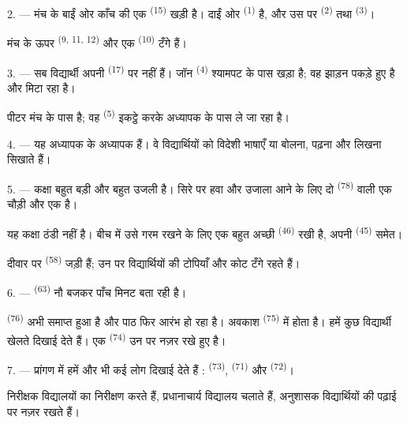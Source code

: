 2. --- मंच के बाईं ओर काँच की एक  \textsuperscript{(15)} खड़ी है।
दाईं ओर  \textsuperscript{(1)} है, और उस पर 
\textsuperscript{(2)} तथा  \textsuperscript{(3)}।

मंच के ऊपर  \textsuperscript{(9, 11, 12)} और एक
 \textsuperscript{(10)} टँगे हैं।

3. --- सब विद्यार्थी अपनी  \textsuperscript{(17)} पर नहीं हैं। जॉन
\textsuperscript{(4)} श्यामपट के पास खड़ा है; वह झाड़न पकड़े हुए है और
 मिटा रहा है।

पीटर मंच के पास है; वह  \textsuperscript{(5)} इकट्ठे करके
अध्यापक के पास ले जा रहा है।

4. --- यह अध्यापक  के अध्यापक हैं। वे विद्यार्थियों को
विदेशी भाषाएँ  या
 बोलना, पढ़ना और लिखना सिखाते हैं।

5. --- कक्षा बहुत बड़ी और बहुत उजली है। सिरे पर हवा और उजाला आने के लिए दो
 \textsuperscript{(78)} वाली एक चौड़ी  और एक
 है।

यह कक्षा ठंडी नहीं है। बीच में उसे गरम रखने के लिए एक बहुत अच्छी
 \textsuperscript{(46)} रखी है, अपनी 
\textsuperscript{(45)} समेत।

दीवार पर  \textsuperscript{(58)} जड़ी हैं; उन पर विद्यार्थियों की
टोपियाँ और कोट टँगे रहते हैं।

\VUsaut{5.2mm}
\VUsaut{3.6mm}

6. ---  \textsuperscript{(63)} नौ बजकर पाँच मिनट बता रही है।

 \textsuperscript{(76)} अभी समाप्त हुआ है और पाठ फिर आरंभ हो रहा है।
अवकाश  \textsuperscript{(75)} में होता है। हमें कुछ विद्यार्थी खेलते
दिखाई देते हैं। एक  \textsuperscript{(74)} उन पर नज़र रखे हुए
है।

7. --- प्रांगण में हमें और भी कई लोग दिखाई देते हैं : 
\textsuperscript{(73)},  \textsuperscript{(71)} और 
\textsuperscript{(72)}।

निरीक्षक विद्यालयों का निरीक्षण करते हैं, प्रधानाचार्य विद्यालय चलाते हैं,
अनुशासक विद्यार्थियों की पढ़ाई पर नज़र रखते हैं।

